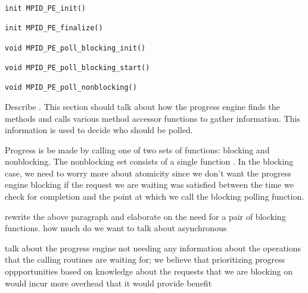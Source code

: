 \begin{verbatim}
init MPID_PE_init()

init MPID_PE_finalize()

void MPID_PE_poll_blocking_init()

void MPID_PE_poll_blocking_start()

void MPID_PE_poll_nonblocking()
\end{verbatim}

\todo Describe .  This section should talk about how the
progress engine finds the methods and calls various method accessor functions
to gather information.  This information is used to decide who should be
polled.

Progress is be made by calling one of two sets of functions: blocking and
nonblocking.  The nonblocking set consists of a single function
.  In the blocking case, we need to worry more
about atomicity since we don't want the progress engine blocking if the
request we are waiting was satisfied between the time we check for completion
and the point at which we call the
blocking polling function.  

\todo [BRT] rewrite the above paragraph and elaborate on the need for a pair
of blocking functions.  how much do we want to talk about asynchronous 

\todo talk about the progress engine not needing any information about the
operations that the calling routines are waiting for; we believe that
prioritizing progress oppportunities based on knowledge about the requests that
we are blocking on would incur more overhead that it would provide benefit


% 

